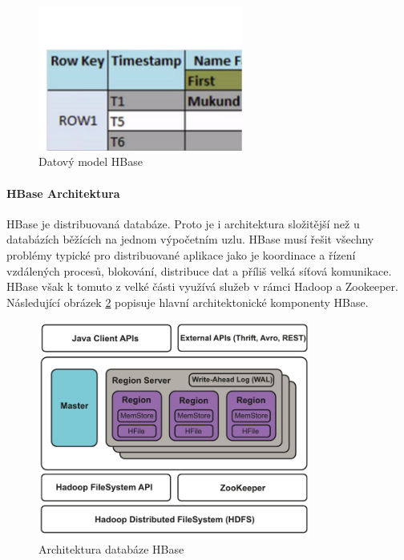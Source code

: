 \documentclass[thesis=M,czech]{FITthesis}[2012/06/26]
\begin{document}
\begin{figure}\centering
	\includegraphics[width=0.6\textwidth, angle=0]{files/Hbase}
	\caption[Datový model HBase]{Datový model HBase}\label{fig:hbase}
\end{figure}

\paragraph{HBase Architektura}
HBase je distribuovaná databáze. Proto je i architektura složitější než u databázích běžících na jednom výpočetním uzlu. HBase musí řešit všechny problémy typické pro distribuované aplikace jako je koordinace a řízení vzdálených procesů, blokování, distribuce dat a příliš velká síťová komunikace. HBase však k tomuto z velké části využívá služeb v rámci Hadoop a Zookeeper. Následující obrázek \ref{fig:hbasearch} popisuje hlavní architektonické komponenty HBase.
\begin{figure}\centering
	\includegraphics[width=0.8\textwidth, angle=0]{files/hbase-architecture}
	\caption[Architektura databáze HBase]{Architektura databáze HBase}\label{fig:hbasearch}
\end{figure}
\end{document}

